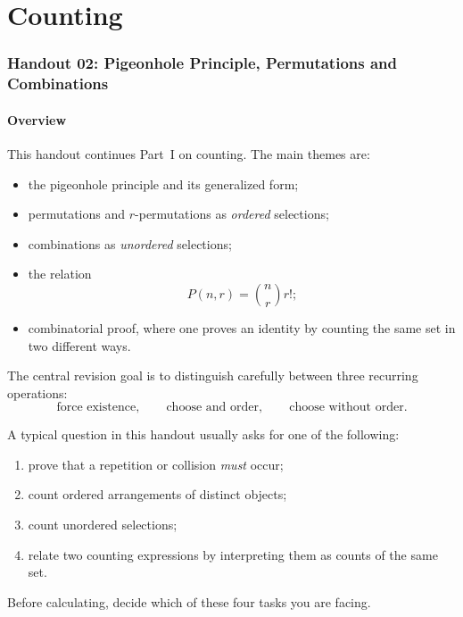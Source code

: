 \part{Counting}
\section{Handout 02: Pigeonhole Principle, Permutations and Combinations}

\subsection{Overview}

This handout continues Part~I on counting. The main themes are:
\begin{itemize}[leftmargin=*]
    \item the pigeonhole principle and its generalized form;
    \item permutations and $r$-permutations as \emph{ordered} selections;
    \item combinations as \emph{unordered} selections;
    \item the relation
    \[
    P(n,r)=\binom{n}{r}r!;
    \]
    \item combinatorial proof, where one proves an identity by counting the same set in two different ways.
\end{itemize}

The central revision goal is to distinguish carefully between three recurring operations:
\[
\text{force existence},\qquad \text{choose and order},\qquad \text{choose without order}.
\]

\begin{examtip}[title={Main recognition goals for this handout}]
A typical question in this handout usually asks for one of the following:
\begin{enumerate}[leftmargin=*]
    \item prove that a repetition or collision \emph{must} occur;
    \item count ordered arrangements of distinct objects;
    \item count unordered selections;
    \item relate two counting expressions by interpreting them as counts of the same set.
\end{enumerate}
Before calculating, decide which of these four tasks you are facing.
\end{examtip}

